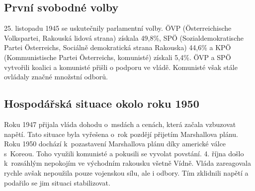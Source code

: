 \documentclass[a2 paper]{article}
\begin{document}
\begin{landscape}
\begin{minipage}[c]{\linewidth}
\begin{minipage}[t]{0.5\linewidth}
\begin{minipage}[t]{\linewidth}
\end{minipage}
	\subsection*{První svobodné volby}
	25. listopadu 1945 se uskutečnily parlamentní volby. ÖVP (Österreichische Volkspartei, Rakouská lidová strana) získala 49,8\%, SPÖ (Sozialdemokratische Partei Österreichs, Sociálně demokratická strana Rakouska) 44,6\% a KPÖ (Kommunistische Partei Österreichs, komunisté) získali 5,4\%. ÖVP a SPÖ vytvořili koalici a komunisté přišli o podporu ve vládě. Komunisté však stále ovládaly značné množstní odborů.
	\subsection*{Hospodářská situace okolo roku 1950}
	Roku 1947 přijala vláda dohodu o~msdách a cenách, která začala vzbuzovat napětí. Tato situace byla vyřešena o~rok pozdějí přijetím Marshallova plánu. Roku 1950 dochází k~pozastavení Marshallova plánu díky americké válce s~Koreou. Toho využili komunisté a pokusili se vyvolat povstání. 4. října došlo k~rozsáhlým nepokojím ve východním rakousku všetně Vídně. Vláda zareagovala rychle avšak nepoužila pouze vojenskou sílu, ale i odbory. Tím zklidnili napětí a podařilo se jim situaci stabilizovat.

\end{minipage}
\end{minipage}
\end{landscape}
\end{document}

